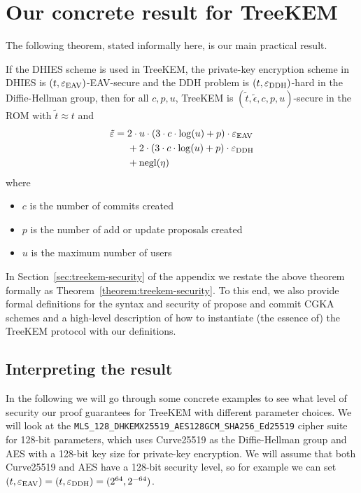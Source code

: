\section{Our concrete result for TreeKEM}

The following theorem, stated informally here, is our main practical result.

\begin{theorem}[Informal] \label{theorem:treekem-security-informal}
	If the DHIES scheme is used in TreeKEM, the private-key encryption scheme in DHIES is $(t, \varepsilon_\mathrm{EAV})$-EAV-secure and the DDH problem is $(t, \varepsilon_\mathrm{DDH})$-hard in the Diffie-Hellman group, then for all $c, p, u$, TreeKEM is $(\tilde{t}, \tilde{\epsilon}, c, p, u)$-secure in the ROM with $\tilde{t} \approx t$ and
	\begin{align*}
		\begin{split}
			\tilde{\varepsilon} ={} & 2 \cdot u \cdot (3 \cdot c \cdot \log(u) + p) \cdot \varepsilon_\mathrm{EAV} \\
			& + 2 \cdot (3 \cdot c \cdot \log(u) + p) \cdot \varepsilon_\mathrm{DDH} \\
			& + \mathrm{negl}(\eta)
		\end{split}
	\end{align*}
	where
	\begin{itemize}
		\item $c$ is the number of commits created
		\item $p$ is the number of add or update proposals created
		\item $u$ is the maximum number of users
	\end{itemize}
\end{theorem}

In Section~\ref{sec:treekem-security} of the appendix we restate the above theorem formally as Theorem~\ref{theorem:treekem-security}. To this end, we also provide formal definitions for the syntax and security of propose and commit CGKA schemes and a high-level description of how to instantiate (the essence of) the TreeKEM protocol with our definitions.

\subsection{Interpreting the result}

In the following we will go through some concrete examples to see what level of security our proof guarantees for TreeKEM with different parameter choices. We will look at the \texttt{MLS\_128\_DHKEMX25519\_AES128GCM\_SHA256\_Ed25519} cipher suite \cite[Section~17.1]{rfc9420} for 128-bit parameters, which uses Curve25519 as the Diffie-Hellman group and AES with a 128-bit key size for private-key encryption. We will assume that both Curve25519 and AES have a 128-bit security level, so for example we can set $(t, \varepsilon_\mathrm{EAV}) = (t, \varepsilon_\mathrm{DDH}) = (2^{64}, 2^{-64})$.

